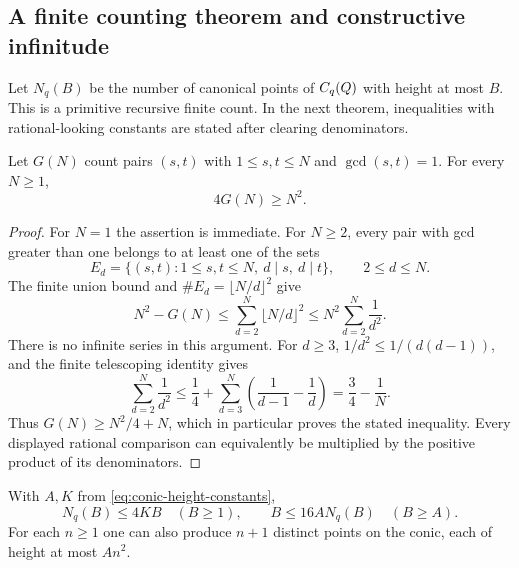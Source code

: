 \subsection{A finite counting theorem and constructive infinitude}

Let $N_q(B)$ be the number of canonical points of $C_q(Q)$ with
height at most $B$.  This is a primitive recursive finite count.  In
the next theorem, inequalities with rational-looking constants are
stated after clearing denominators.

\begin{lemma}
\label{lem:conic-coprime-count}
Let $G(N)$ count pairs $(s,t)$ with $1\leq s,t\leq N$ and
$\gcd(s,t)=1$.  For every $N\geq1$,
\[
 4G(N)\geq N^2.
\]
\end{lemma}

\begin{proof}
For $N=1$ the assertion is immediate.  For $N\geq2$, every pair
with gcd greater than one belongs to at least one of the sets
\[
 E_d=\{(s,t):1\leq s,t\leq N,\ d\mid s,\ d\mid t\},
 \qquad 2\leq d\leq N.
\]
The finite union bound and $\#E_d=\lfloor N/d\rfloor^2$ give
\[
 N^2-G(N)\leq\sum_{d=2}^N\lfloor N/d\rfloor^2
 \leq N^2\sum_{d=2}^N\frac1{d^2}.
\]
There is no infinite series in this argument.  For $d\geq3$,
$1/d^2\leq1/(d(d-1))$, and the finite telescoping identity gives
\[
 \sum_{d=2}^N\frac1{d^2}
 \leq\frac14+\sum_{d=3}^N\left(\frac1{d-1}-\frac1d\right)
 =\frac34-\frac1N.
\]
Thus $G(N)\geq N^2/4+N$, which in particular proves the stated
inequality.  Every displayed rational comparison can equivalently
be multiplied by the positive product of its denominators.
\end{proof}

\begin{theorem}
\label{thm:conic-count}
With $A,K$ from \eqref{eq:conic-height-constants},
\[
 N_q(B)\leq4KB\quad(B\geq1),
 \qquad
 B\leq16A N_q(B)\quad(B\geq A).
\]
For each $n\geq1$ one can also produce $n+1$ distinct points on
the conic, each of height at most $An^2$.
\end{theorem}

